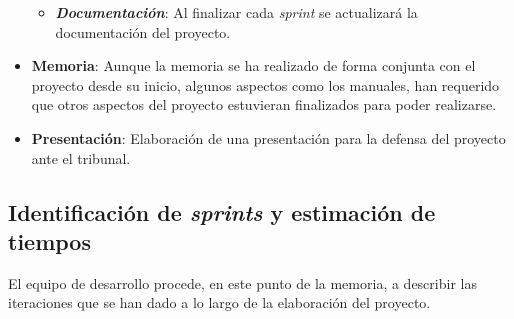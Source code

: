 \begin{itemize}
\begin{itemize}
        \item \textbf{\textit{Documentación}}: Al finalizar cada \textit{sprint} se actualizará 
        la documentación del proyecto.
    \end{itemize}

    \item \textbf{Memoria}: Aunque la memoria se ha realizado de forma conjunta con el 
    proyecto desde su inicio, algunos aspectos como los manuales, han requerido que otros 
    aspectos del proyecto estuvieran finalizados para poder realizarse.

    \item \textbf{Presentación}: Elaboración de una presentación para la defensa del proyecto ante 
    el tribunal.
\end{itemize}

\subsection{Identificación de \textit{sprints} y estimación de tiempos}
El equipo de desarrollo procede, en este punto de la memoria, a describir 
las iteraciones que se han dado a lo largo de la elaboración del proyecto.

